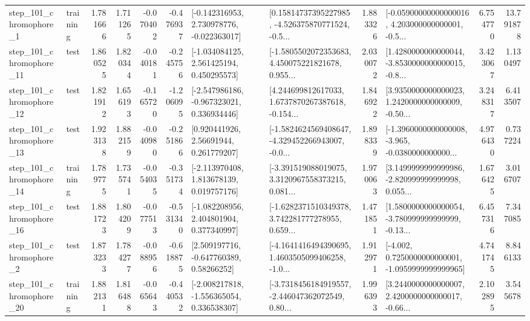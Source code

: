 \begin{tabular}{llrrrrllrlrr}
   step\_101\_chromophore\_1 &  training &      1.781666 &    1.711265 &     -0.070402 & -0.476937 &   [-0.142316953, 2.730978776, -0.022363017] &  [0.15814737395227985, -4.526375870771524, -0.5... &       1.883326 &  [-0.05900000000000016, 4.203000000000001, -0.5... &            6.754770 &         13.791878 \\
  step\_101\_chromophore\_11 &      test &      1.860525 &    1.820344 &     -0.040181 & -0.245756 &    [-1.034084125, 2.561425194, 0.450295573] &  [-1.5805502072353683, 4.450075221821678, 0.955... &       2.030072 &  [1.4280000000000044, -3.8530000000000015, -0.8... &            3.423067 &          1.130497 \\
  step\_101\_chromophore\_12 &      test &      1.821912 &    1.656193 &     -0.165720 & -1.206095 &   [-2.547986186, -0.967323021, 0.336934446] &  [4.244699812617033, 1.6737870267387618, -0.154... &       1.846922 &  [3.9350000000000023, 1.2420000000000009, -0.50... &            3.248317 &          6.413507 \\
  step\_101\_chromophore\_13 &      test &      1.923138 &    1.882159 &     -0.040980 & -0.251866 &      [0.920441926, 2.56691944, 0.261779207] &  [-1.5824624569408647, -4.329452266943007, -0.0... &       1.898339 &  [-1.3960000000000008, -3.965, -0.0380000000000... &            4.976430 &          0.737224 \\
  step\_101\_chromophore\_14 &  training &      1.789775 &    1.735741 &     -0.054035 & -0.351734 &    [-2.113970408, 1.813678139, 0.019757176] &  [-3.391519088019075, 3.3120967558373215, 0.081... &       1.970063 &  [3.1499999999999986, -2.820999999999998, 0.055... &            1.676425 &          3.016707 \\
  step\_101\_chromophore\_16 &      test &      1.881723 &    1.804209 &     -0.077513 & -0.531340 &    [-1.082208956, 2.404801904, 0.377340997] &  [-1.6282371510349378, 3.742281777278955, 0.659... &       1.471851 &  [1.5800000000000054, -3.780999999999999, -0.13... &            6.457316 &          7.347085 \\
   step\_101\_chromophore\_2 &      test &      1.873233 &    1.784277 &     -0.088956 & -0.618875 &     [2.509197716, -0.647760389, 0.58266252] &  [-4.1641416494390695, 1.4603505099406258, -1.0... &       1.912971 &  [-4.002, 0.7250000000000001, -1.0959999999999965] &            4.741745 &          8.846133 \\
  step\_101\_chromophore\_20 &  training &      1.882131 &    1.816488 &     -0.065643 & -0.440532 &   [-2.008217818, -1.556365054, 0.336538307] &  [-3.7318456184919557, -2.446047362072549, 0.80... &       1.996393 &  [3.2440000000000007, 2.4200000000000017, -0.66... &            2.102895 &          3.545678 \\

\end{tabular}
